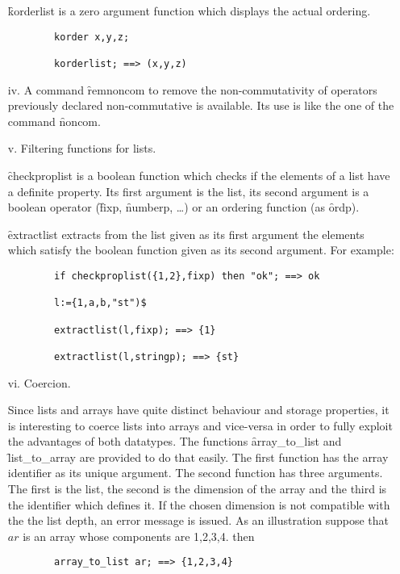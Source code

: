 \begin{itemize}
\hypertarget{operator:KORDERLIST}{}
\f{korderlist} is a zero argument function which displays the actual
ordering.
\begin{verbatim}
        korder x,y,z;

        korderlist; ==> (x,y,z)
\end{verbatim}

\item[iv.]
  \hypertarget{command:REMNONCOM}{}
  A command \f{remnoncom} to remove the non-commutativity of 
operators previously declared non-commutative is available. Its use is like 
the one of the command \f{noncom}.

\item[v.] Filtering functions for lists.

  \hypertarget{operator:CHECKPROPLIST}{}
\f{checkproplist}  is a  boolean function which checks if the
elements of a list have a definite property. Its first argument
is the list, its second argument is a boolean operator
(\f{fixp}, \f{numberp}, \ldots) or an ordering function (as \f{ordp}).

  \hypertarget{operator:EXTRACTLIST}{}
\f{extractlist} extracts from the list given as its first argument
the elements which satisfy the boolean function given as its second
argument. For example:
\begin{verbatim}
        if checkproplist({1,2},fixp) then "ok"; ==> ok

        l:={1,a,b,"st")$

        extractlist(l,fixp); ==> {1}

        extractlist(l,stringp); ==> {st}
\end{verbatim}
\item[vi.] Coercion.

\hypertarget{operator:ARRAY_TO_LIST}{}
\hypertarget{operator:LIST_TO_ARRAY}{}
Since lists and arrays have quite distinct behaviour and storage properties,  
it is interesting to coerce lists into arrays and vice-versa in order to 
fully exploit the advantages of both datatypes. The functions  
\f{array\_to\_list} and \f{list\_to\_array} are provided to do that easily.
The first function has the array identifier as its unique argument. 
The second
function has three arguments. The first is the list, the second is the 
dimension of the array and the third is the identifier which defines it.  
If the chosen dimension is not compatible with the
the list depth, an error message is issued.  
As an illustration suppose that $ar$ is an array whose components are  
1,2,3,4. then
\begin{verbatim}
        array_to_list ar; ==> {1,2,3,4}


\end{verbatim}
\end{itemize}
